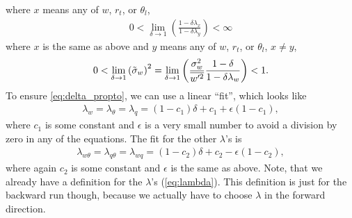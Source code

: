where $x$ means any of $w$, $r_t$, or $\theta_l$,
\begin{align}
    0 < \lim_{\delta\to 1} \left(\frac{1-\delta\lambda_x}{1-\delta\lambda_y}\right) < \infty
\end{align}
where $x$ is the same as above and $y$ means any of $w$, $r_t$, or $\theta_l$, $x \neq y$,
\begin{align}
    0 < \lim_{\delta \to 1} \left({\tilde{\sigma}_w}\right)^2
    = \lim_{\delta \to 1} \left(\frac{\sigma_w^2}{\overline{w'^2}} \frac{1-\delta}{1-\delta \lambda_w}\right) < 1.
\end{align}
To ensure \cref{eq:delta_propto}, we can use a linear \enquote{fit}, which looks like
\begin{align}
    \label{eq:lambda_fit}
    \lambda_w = \lambda_\theta = \lambda_q
    = (1 - c_1) \delta + c_1 + \epsilon (1 - c_1),
\end{align}
where $c_1$ is some constant and $\epsilon$ is a very small number to avoid a division by zero in any of the equations.
The fit for the other $\lambda$'s is
\begin{align}
    \label{eq:lambda_xy_fit}
    \lambda_{w\theta} = \lambda_{q\theta} = \lambda_{wq}
    = (1 - c_2) \delta + c_2 - \epsilon (1 - c_2),
\end{align}
where again $c_2$ is some constant and $\epsilon$ is the same as above.
Note, that we already have a definition for the $\lambda$'s (\cref{eq:lambda}).
This definition is just for the backward run though,
because we actually have to choose $\lambda$ in the forward direction.

